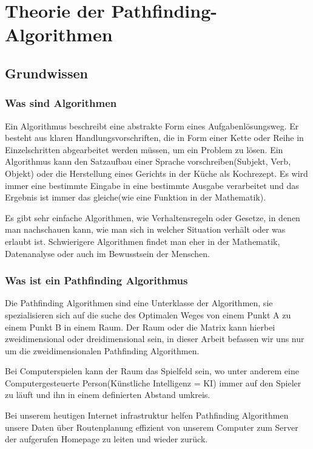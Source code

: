 \chapter{Theorie der Pathfinding-Algorithmen}

\section{Grundwissen}

\subsection{Was sind Algorithmen}

Ein Algorithmus beschreibt eine abstrakte Form eines Aufgabenlösungsweg.
Er besteht aus klaren Handlungsvorschriften, die in Form einer Kette
oder Reihe in Einzelschritten abgearbeitet werden müssen, um ein Problem
zu lösen. Ein Algorithmus kann den Satzaufbau einer Sprache
vorschreiben(Subjekt, Verb, Objekt) oder die Herstellung eines Gerichts
in der Küche als Kochrezept. Es wird immer eine bestimmte Eingabe in
eine bestimmte Ausgabe verarbeitet und das Ergebnis ist immer das
gleiche(wie eine Funktion in der Mathematik).

Es gibt sehr einfache Algorithmen, wie Verhaltensregeln oder Gesetze, in
denen man nachschauen kann, wie man sich in welcher Situation verhält
oder was erlaubt ist. Schwierigere Algorithmen findet man eher in der
Mathematik, Datenanalyse oder auch im Bewusstsein der Menschen.
\cite[Wikipedia, 2018]{wikialgo}

\subsection{Was ist ein Pathfinding Algorithmus}

Die Pathfinding Algorithmen sind eine Unterklasse der Algorithmen, sie
spezialisieren sich auf die suche des Optimalen Weges von einem Punkt A
zu einem Punkt B in einem Raum. Der Raum oder die Matrix kann hierbei
zweidimensional oder dreidimensional sein, in dieser Arbeit befassen wir
uns nur um die zweidimensionalen Pathfinding Algorithmen.

Bei Computerspielen kann der Raum das Spielfeld sein, wo unter anderem
eine Computergesteuerte Person(Künstliche Intelligenz = KI) immer auf
den Spieler zu läuft und ihn in einem definierten Abstand umkreis.

Bei unserem heutigen Internet infrastruktur helfen Pathfinding
Algorithmen unsere Daten über Routenplanung effizient von unserem
Computer zum Server der aufgerufen Homepage zu leiten und wieder zurück.

